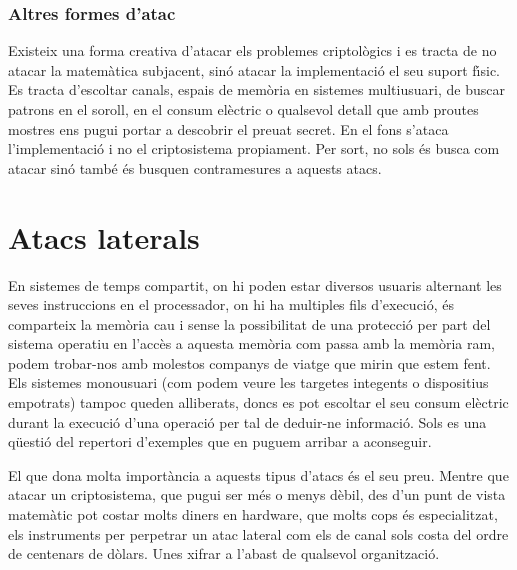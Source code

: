 \documentclass[12pt,twoside,catalan,a4paper]{book}%
\numberwithin{figure}{section}		%
\theoremstyle{definition}   			%
\theoremstyle{saltolinea}   			%
\begin{document}
\subsection{Altres formes d'atac}\label{sec:atacsLaterals}

Existeix una forma creativa d'atacar els problemes criptol\`ogics i es tracta de no atacar la matem\`atica subjacent, sin\'o atacar la implementaci\'o el seu suport f\'{\i}sic. Es tracta d'escoltar canals, espais de mem\`oria en sistemes multiusuari, de buscar patrons en el soroll, en el consum el\`ectric o qualsevol detall que amb proutes mostres ens pugui portar a descobrir el preuat secret. En el fons s'ataca l'implementaci\'o i no el criptosistema propiament. Per sort, no sols \'es busca com atacar sin\'o tamb\'e \'es busquen contramesures a aquests atacs.

\chapter{Atacs laterals}\label{ch:atacsLaterals}

En sistemes de temps compartit, on hi poden estar diversos usuaris alternant les seves instruccions en el processador, on hi ha multiples fils d'execuci\'o, \'es comparteix la mem\`oria cau i sense la possibilitat de una protecci\'o per part del sistema operatiu en l'acc\`es a aquesta mem\`oria com passa amb la mem\`oria ram, podem trobar-nos amb molestos companys de viatge que mirin que estem fent. Els sistemes monousuari (com podem veure les targetes inte\lgem{}gents o dispositius empotrats) tampoc queden alliberats, doncs es pot escoltar el seu consum el\`ectric durant la execuci\'o d'una operaci\'o per tal de deduir-ne informaci\'o. Sols es una q\"uesti\'o del repertori d'exemples que en puguem arribar a aconseguir.

El que dona molta import\`ancia a aquests tipus d'atacs \'es el seu preu. Mentre que atacar un criptosistema, que pugui ser m\'es o menys d\`ebil, des d'un punt de vista matem\`atic pot costar molts diners en hardware, que molts cops \'es especialitzat, els instruments per perpetrar un atac lateral com els de canal sols costa del ordre de centenars de d\`olars. Unes xifrar a l'abast de qualsevol organitzaci\'o.
\end{document}
